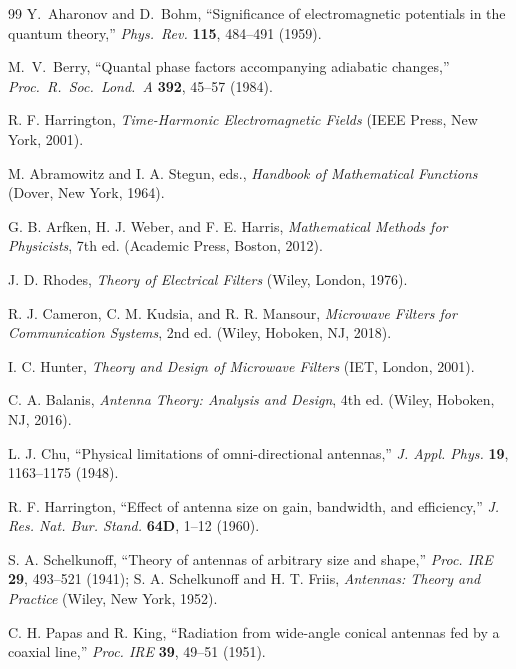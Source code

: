 \documentclass[
  aip,
  amsmath,amssymb,
  preprint
]{revtex4-1}
\begin{document}
\begin{thebibliography}{99}
Y.~Aharonov and D.~Bohm,
``Significance of electromagnetic potentials in the quantum theory,''
\emph{Phys.\ Rev.} \textbf{115}, 484--491 (1959).

M.~V.~Berry,
``Quantal phase factors accompanying adiabatic changes,''
\emph{Proc.\ R.\ Soc.\ Lond.\ A} \textbf{392}, 45--57 (1984).


R. F. Harrington, \textit{Time-Harmonic Electromagnetic Fields} (IEEE Press, New York, 2001).

M. Abramowitz and I. A. Stegun, eds., \textit{Handbook of Mathematical Functions} (Dover, New York, 1964).

G. B. Arfken, H. J. Weber, and F. E. Harris, \textit{Mathematical Methods for Physicists}, 7th ed. (Academic Press, Boston, 2012).

J. D. Rhodes, \textit{Theory of Electrical Filters} (Wiley, London, 1976).

R. J. Cameron, C. M. Kudsia, and R. R. Mansour, \textit{Microwave Filters for Communication Systems}, 2nd ed. (Wiley, Hoboken, NJ, 2018).

I. C. Hunter, \textit{Theory and Design of Microwave Filters} (IET, London, 2001).

C. A. Balanis, \textit{Antenna Theory: Analysis and Design}, 4th ed. (Wiley, Hoboken, NJ, 2016).

L. J. Chu, ``Physical limitations of omni-directional antennas,'' \textit{J. Appl. Phys.} \textbf{19}, 1163--1175 (1948).

R. F. Harrington, ``Effect of antenna size on gain, bandwidth, and efficiency,'' \textit{J. Res. Nat. Bur. Stand.} \textbf{64D}, 1--12 (1960).

S. A. Schelkunoff, ``Theory of antennas of arbitrary size and shape,'' \textit{Proc. IRE} \textbf{29}, 493--521 (1941); S. A. Schelkunoff and H. T. Friis, \textit{Antennas: Theory and Practice} (Wiley, New York, 1952).

C. H. Papas and R. King, ``Radiation from wide-angle conical antennas fed by a coaxial line,'' \textit{Proc. IRE} \textbf{39}, 49--51 (1951).

\end{thebibliography}
\end{document}
